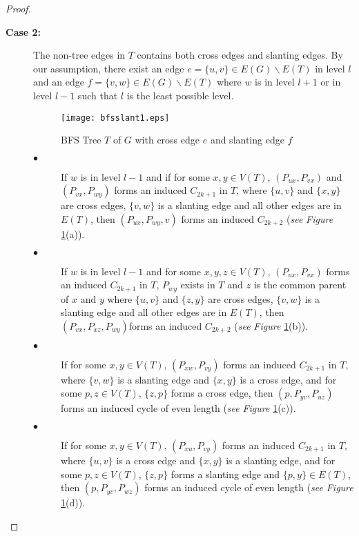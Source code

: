 \documentclass[runningheads]{llncs}
\begin{document}
\begin{proof}
\begin{description}
\item[\bf{Case 2:}] The non-tree edges in $T$ contains both cross edges and slanting edges. By our assumption, there exist an edge $e =\{u,v\} \in E(G)\backslash E(T)$ in level $l$ and an edge $f = \{v,w\} \in E(G)\backslash E(T)$ where $w$ is in level $l+1$ or in level $l-1$ such that $l$ is the least possible level.

\begin{figure}[h]
\begin{center}
\texttt{[image: bfsslant1.eps]}
\caption{BFS Tree $T$ of $G$ with cross edge $e$ and slanting edge $f$}
\label{bfs2}
\end{center}
\end{figure}

\begin{description}

\item[$\bullet$] If $w$ is in level $l-1$ and if for some $x, y \in V(T)$, $(P_{ux}, P_{vx})$ and $(P_{vx}, P_{wy})$ forms an induced $C_{2k+1}$ in $T$, where $\{u,v\}$ and $\{x,y\}$ are cross edges, $\{v,w\}$ is a slanting edge and all other edges are in $E(T)$, then $(P_{ux}, P_{wy}, v)$ forms an induced $C_{2k+2}$ (\emph{see} \emph{Figure }\ref{bfs2}(a)). 


\item[$\bullet$] If $w$ is in level $l-1$ and for some $x, y, z \in V(T)$, $(P_{ux}, P_{vx})$ forms an induced $C_{2k+1}$ in $T$, $P_{wy}$ exists in $T$ and $z$ is the common parent of $x$ and $y$ where $\{u,v\}$ and $\{z,y\}$ are cross edges, $\{v,w\}$ is a slanting edge and all other edges are in $E(T)$, then $(P_{vx}, P_{xz}, P_{wy})$forms an induced $C_{2k+2}$ (\emph{see} \emph{Figure }\ref{bfs2}(b)).

\item[$\bullet$] If for some $x, y\in V(T)$, $(P_{xw},P_{vy})$ forms an induced $C_{2k+1}$ in $T$, where $\{v,w\}$ is a slanting edge and $\{x,y\}$ is a cross edge, and for some $p,z \in V(T)$, $\{z,p\}$ forms a cross edge, then $(p, P_{yv},P_{uz})$ forms an induced cycle of even length (\emph{see} \emph{Figure }\ref{bfs2}(c)). 

\item[$\bullet$] If for some $x, y\in V(T)$, $(P_{xu},P_{vy})$ forms an induced $C_{2k+1}$ in $T$, where $\{u,v\}$ is a cross edge and $\{x,y\}$ is a slanting edge, and for some $p,z \in V(T)$, $\{z,p\}$ forms a slanting edge and $\{p,y\} \in E(T)$, then $(p, P_{yv},P_{wz})$ forms an induced cycle of even length (\emph{see} \emph{Figure }\ref{bfs2}(d)). 




\end{description}
\end{description}
\end{proof}
\end{document}
